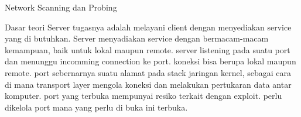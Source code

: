 Network Scanning dan Probing

Dasar teori
 Server tugasnya adalah melayani client dengan menyediakan service yang di butuhkan. Server menyadiakan service dengan bermacam-macam kemampuan, baik untuk lokal maupun remote. server listening pada suatu port dan menunggu incomming connection ke port. koneksi bisa berupa lokal maupun remote.
    port sebernarnya suatu alamat pada stack jaringan kernel, sebagai cara di mana transport layer mengola koneksi dan melakukan pertukaran data antar komputer. port yang terbuka mempunyai resiko terkait dengan exploit. perlu dikelola port mana yang perlu di buka ini terbuka.
 